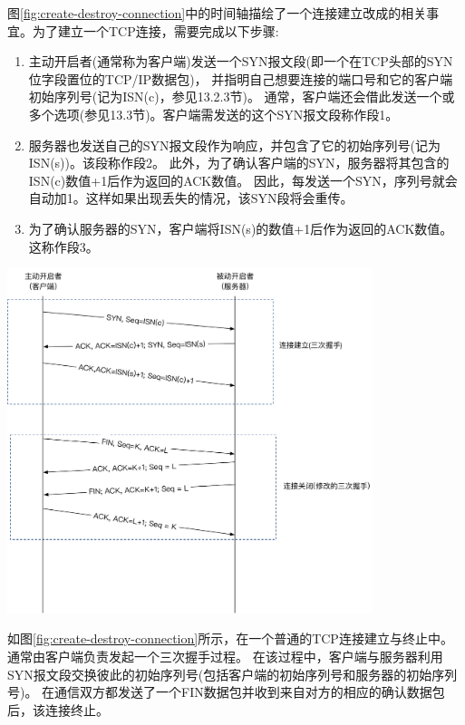 \documentclass{../main.tex}{subfiles}
\begin{document}
图\ref{fig:create-destroy-connection}中的时间轴描绘了一个连接建立改成的相关事宜。为了建立一个TCP连接，需要完成以下步骤:
\begin{enumerate}
    \item 主动开启者(通常称为客户端)发送一个SYN报文段(即一个在TCP头部的SYN位字段置位的TCP/IP数据包)，
        并指明自己想要连接的端口号和它的客户端初始序列号(记为ISN(c)，参见13.2.3节)。
        通常，客户端还会借此发送一个或多个选项(参见13.3节)。客户端需发送的这个SYN报文段称作段1。
    \item 服务器也发送自己的SYN报文段作为响应，并包含了它的初始序列号(记为ISN(s))。该段称作段2。
        此外，为了确认客户端的SYN，服务器将其包含的ISN(c)数值+1后作为返回的ACK数值。
        因此，每发送一个SYN，序列号就会自动加1。这样如果出现丢失的情况，该SYN段将会重传。
    \item 为了确认服务器的SYN，客户端将ISN(s)的数值+1后作为返回的ACK数值。这称作段3。    
\end{enumerate}
\begin{center}
    \includegraphics[width=0.8\textwidth]{resources/images/tcp-ip/create-destroy-connection.pdf}
    \label{fig:create-destroy-connection}
\end{center}

如图\ref{fig:create-destroy-connection}所示，在一个普通的TCP连接建立与终止中。
通常由客户端负责发起一个三次握手过程。
在该过程中，客户端与服务器利用SYN报文段交换彼此的初始序列号(包括客户端的初始序列号和服务器的初始序列号)。
在通信双方都发送了一个FIN数据包并收到来自对方的相应的确认数据包后，该连接终止。
\end{document}
